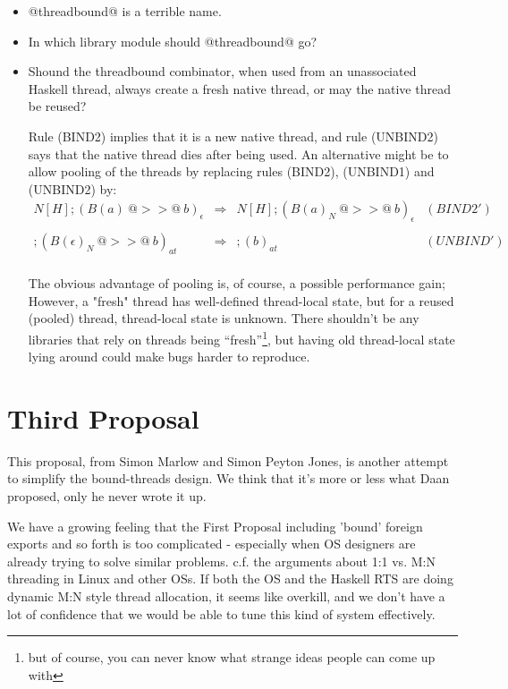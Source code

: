 \documentclass{article}
\newcommand{\hcall}{H}
\newcommand{\bound}[1]{B(#1)}
\begin{document}
\begin{itemize}
\item @threadbound@ is a terrible name.
\item In which library module should @threadbound@ go?
\item Shound the threadbound combinator, when used from an unassociated Haskell thread,
always create a fresh native thread, or may the native thread be reused?

Rule (BIND2) implies that it is a new native thread, and rule (UNBIND2) says that the
native thread dies after being used. An alternative might be to allow pooling of
the threads by replacing rules (BIND2), (UNBIND1) and (UNBIND2) by:
$$
\begin{array}{rcll}
N[\hcall]; (\bound{a}~@>>@~b)_{\epsilon} 
        & \Rightarrow 
        & N[\hcall]; (\bound{a}_N~@>>@~b)_{\epsilon} & (BIND2') \\
\\
; (\bound{\epsilon}_N~@>>@~b)_{at}
        & \Rightarrow 
        & ; (b)_{at} & (UNBIND') \\
\end{array}
$$

The obvious advantage of pooling is, of course, a possible performance gain;
However, a "fresh" thread has well-defined thread-local state, but for a 
reused (pooled) thread, thread-local state is unknown. There shouldn't be
any libraries that rely on threads being ``fresh''\footnote{but of course,
you can never know what strange ideas people can come up with}, but having old
thread-local state lying around could make bugs harder to reproduce.

\end{itemize}

\newpage
\part{Third Proposal}

This proposal, from Simon Marlow and Simon Peyton Jones, is another attempt to simplify
the bound-threads design.  We think that it's more or less what Daan proposed, only he never wrote it up.

We have a growing feeling that the First Proposal including
'bound' foreign exports and so forth is too complicated - especially
when OS designers are already trying to solve similar problems.
c.f. the arguments about 1:1 vs. M:N threading in Linux and other OSs.
If both the OS and the Haskell RTS are doing dynamic M:N style thread
allocation, it seems like overkill, and we don't have a lot of
confidence that we would be able to tune this kind of system
effectively.
\end{document}
